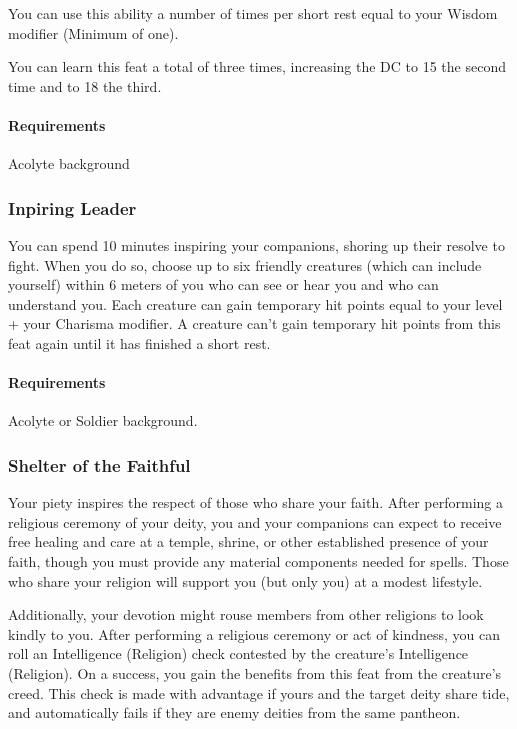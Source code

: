             You can use this ability a number of times per short rest equal to your Wisdom modifier (Minimum of one).

            You can learn this feat a total of three times, increasing the DC to 15 the second time and to 18 the third.
            \paragraph{Requirements} Acolyte background
        \subsubsection{Inpiring Leader} \label{feat::inspiringleader}
            You can spend 10 minutes inspiring your companions, shoring up their resolve to fight.
            When you do so, choose up to six friendly creatures (which can include yourself) within 6 meters of you who can see or hear you and who can understand you.
            Each creature can gain temporary hit points equal to your level + your Charisma modifier.
            A creature can't gain temporary hit points from this feat again until it has finished a short rest.
            \paragraph{Requirements} Acolyte or Soldier background.
        \subsubsection{Shelter of the Faithful} \label{feat::shelterofthefaithful}
            Your piety inspires the respect of those who share your faith.
            After performing a religious ceremony of your deity, you and your companions can expect to receive free healing and care at a temple, shrine, or other established presence of your faith, though you must provide any material components needed for spells.
            Those who share your religion will support you (but only you) at a modest lifestyle.

            Additionally, your devotion might rouse members from other religions to look kindly to you.
            After performing a religious ceremony or act of kindness, you can roll an Intelligence (Religion) check contested by the creature's Intelligence (Religion).
            On a success, you gain the benefits from this feat from the creature's creed.
            This check is made with advantage if yours and the target deity share tide, and automatically fails if they are enemy deities from the same pantheon.

